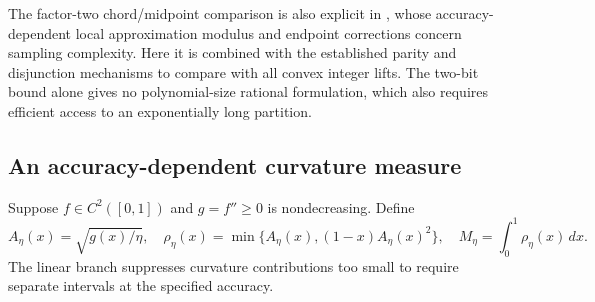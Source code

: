 The factor-two chord/midpoint comparison is also explicit in
\citet[Lemma 2.1]{simchowitz2018}, whose accuracy-dependent local
approximation modulus and endpoint corrections concern sampling
complexity. Here it is combined with the established parity and
disjunction mechanisms \citep{lubin2022,vielma2018} to compare with all
convex integer lifts. The two-bit bound alone gives no polynomial-size
rational formulation, which also requires efficient access to an
exponentially long partition.

\subsection{An accuracy-dependent curvature measure}

Suppose $f\in C^2([0,1])$ and $g=f''\ge0$ is nondecreasing. Define
\begin{equation}\label{eq:curvature-density}
 A_\eta(x)=\sqrt{g(x)/\eta},\quad
 \rho_\eta(x)=\min\{A_\eta(x),(1-x)A_\eta(x)^2\},\quad
 M_\eta=\int_0^1\rho_\eta(x)\,dx.
\end{equation}
The linear branch suppresses curvature contributions too small to
require separate intervals at the specified accuracy.

